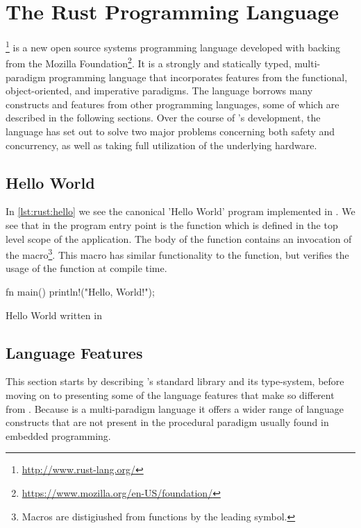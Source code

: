 
\section{The Rust Programming Language} %
\label{sub:the_rust_programming_language}

{\rust}\footnote{\url{http://www.rust-lang.org/}} is a new open source systems programming language developed with backing from the Mozilla Foundation\footnote{\url{https://www.mozilla.org/en-US/foundation/}}.
It is a strongly and statically typed, multi-paradigm programming language that incorporates features from the functional, object-oriented, and imperative paradigms.
The language borrows many constructs and features from other programming languages, some of which are described in the following sections.
Over the course of {\rust}'s development, the language has set out to solve two major problems concerning both safety and concurrency, as well as taking full utilization of the underlying hardware.

\subsection{Hello World}

In \autoref{lst:rust:hello} we see the canonical 'Hello World' program implemented in {\rust}.
We see that in {\rust} the program entry point is the {\main} function which is defined in the top level scope of the application.
The body of the function contains an invocation of the  macro\footnote{Macros are distigiushed from functions by the leading \code{!} symbol.}.
This macro has similar functionality to the {\C}  function, but verifies the usage of the function at compile time.

\begin{listing}[H]
  \begin{rustcode}
fn main() {
  println!("Hello, World!");
}
  \end{rustcode}
  \caption{Hello World written in {\rust}}
  \label{lst:rust:hello}
\end{listing}

\subsection{Language Features}
\label{ssub:rust:features}

This section starts by describing {\rust}'s standard library and its type-system, before moving on to presenting some of the language features that make {\rust} so different from {\C}.
Because {\rust} is a multi-paradigm language it offers a wider range of language constructs that are not present in the procedural paradigm usually found in embedded programming.

